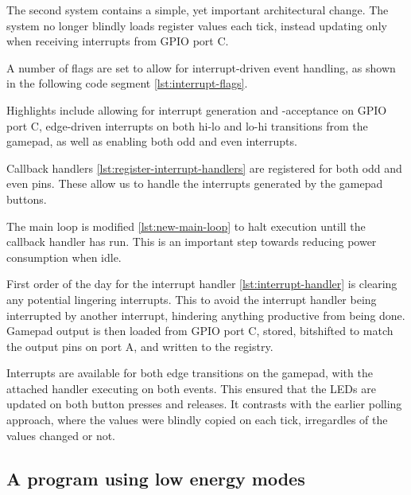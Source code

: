 The second system contains a simple, yet important architectural change. The system no longer blindly loads register values each tick, instead updating only when receiving interrupts from GPIO port C.

A number of flags are set to allow for interrupt-driven event handling, as shown in the following code segment \ref{lst:interrupt-flags}.

Highlights include allowing for interrupt generation and -acceptance on GPIO port C, edge-driven interrupts on both hi-lo and lo-hi transitions from the gamepad, as well as enabling both odd and even interrupts.



Callback handlers \ref{lst:register-interrupt-handlers} are registered for both odd and even pins. These allow us to handle the interrupts generated by the gamepad buttons.



The main loop is modified \ref{lst:new-main-loop} to halt execution untill the callback handler has run. This is an important step towards reducing power consumption when idle.



First order of the day for the interrupt handler \ref{lst:interrupt-handler} is clearing any potential lingering interrupts. This to avoid the interrupt handler being interrupted by another interrupt, hindering anything productive from being done.
Gamepad output is then loaded from GPIO port C, stored, bitshifted to match the output pins on port A, and written to the registry.

Interrupts are available for both edge transitions on the gamepad, with the attached handler executing on both events.
This ensured that the LEDs are updated on both button presses and releases. It contrasts with the earlier polling approach, where the values were blindly copied on each tick, irregardles of the values changed or not.



\subsection{A program using low energy modes}

